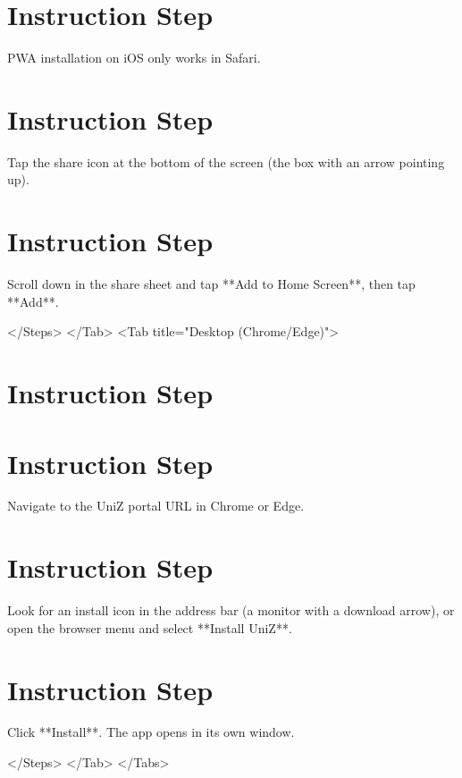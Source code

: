       
\section{Instruction Step}

        PWA installation on iOS only works in Safari.
      
      
\section{Instruction Step}

        Tap the share icon at the bottom of the screen (the box with an arrow
        pointing up).
      
      
\section{Instruction Step}

        Scroll down in the share sheet and tap **Add to Home Screen**, then tap
        **Add**.
      
    </Steps>
  </Tab>
  <Tab title="Desktop (Chrome/Edge)">
    
\section{Instruction Step}

      
\section{Instruction Step}

        Navigate to the UniZ portal URL in Chrome or Edge.
      
      
\section{Instruction Step}

        Look for an install icon in the address bar (a monitor with a download
        arrow), or open the browser menu and select **Install UniZ**.
      
      
\section{Instruction Step}

        Click **Install**. The app opens in its own window.
      
    </Steps>
  </Tab>
</Tabs>


